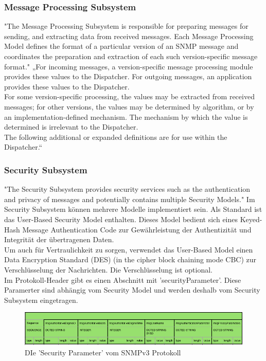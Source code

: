 \documentclass[11pt,a4paper]{article}
\begin{document}
\subsubsection{Message Processing Subsystem}
"The Message Processing Subsystem is responsible for preparing messages for sending, and extracting data from received messages. Each Message Processing Model defines the format of a particular version of an SNMP message and coordinates the preparation and extraction of each such version-specific message format."
\cite{rfcSnmpv3EngineMPS}
„For incoming messages, a version-specific message processing module provides these values to the Dispatcher. For outgoing messages, an application provides these values to the Dispatcher.\\
For some version-specific processing, the values may be extracted from received messages; for other versions, the values may be determined by algorithm, or by an implementation-defined mechanism. The mechanism by which the value is determined is irrelevant to the Dispatcher.\\
The following additional or expanded definitions are for use within the Dispatcher.“
\cite{rfcSnmpEngineMPS2}

\subsubsection{Security Subsystem}
"The Security Subsystem provides security services such as the authentication and privacy of messages and potentially contains multiple Security Models."
\cite{rfcSnmpv3EngineSecurity}
Im Security Subsystem können mehrere Modelle implementiert sein. Als Standard ist das User-Based Security Model enthalten. Dieses Model bedient sich eines Keyed-Hash Message Authentication Code zur Gewährleistung der Authentizität und Integrität der übertragenen Daten.\\
Um auch für Vertraulichkeit zu sorgen, verwendet das User-Based Model einen Data Encryption Standard (DES) (in the cipher block chaining mode CBC) zur Verschlüsselung der Nachrichten. Die Verschlüsselung ist optional.\\
Im Protokoll-Header gibt es einen Abschnitt mit 'securityParameter'. Diese Paramerter sind abhängig vom Security Model und werden deshalb vom Security Subsystem eingetragen.
\begin{figure}[h]
	\centering
	\includegraphics[scale=.58]{Bilder/SNMPv3-Header-SecParam.png}
	\caption{DIe 'Security Parameter' vom SNMPv3 Protokoll}
\end{figure}
\end{document}
